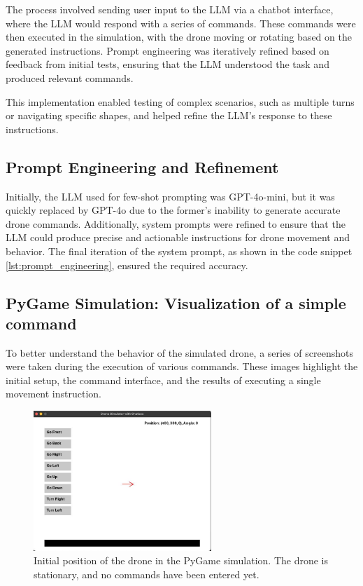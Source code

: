 The process involved sending user input to the \ac{LLM} via a chatbot interface, where the \ac{LLM} would respond with a series of commands. 
These commands were then executed in the simulation, with the drone moving or rotating based on the generated instructions. 
Prompt engineering was iteratively refined based on feedback from initial tests, ensuring that the \ac{LLM} understood the task and produced relevant commands.

This implementation enabled testing of complex scenarios, such as multiple turns or navigating specific shapes, and helped refine the \ac{LLM}'s response to these instructions.

\subsection{Prompt Engineering and Refinement}
Initially, the \ac{LLM} used for few-shot prompting was GPT-4o-mini, but it was quickly replaced by GPT-4o due to the former's inability to generate accurate drone commands. 
Additionally, system prompts were refined to ensure that the \ac{LLM} could produce precise and actionable instructions for drone movement and behavior. 
The final iteration of the system prompt, as shown in the code snippet \ref{lst:prompt_engineering}, ensured the required accuracy.

\subsection{PyGame Simulation: Visualization of a simple command}
To better understand the behavior of the simulated drone, a series of screenshots were taken during the execution of various commands. 
These images highlight the initial setup, the command interface, and the results of executing a single movement instruction.

\begin{figure}[H]
    \centering
    \includegraphics[width=0.6\textwidth]{img/sim_pos_start.jpeg}
    \caption{Initial position of the drone in the PyGame simulation. The drone is stationary, and no commands have been entered yet.}
    \label{fig:sim_pos_start}
\end{figure}

